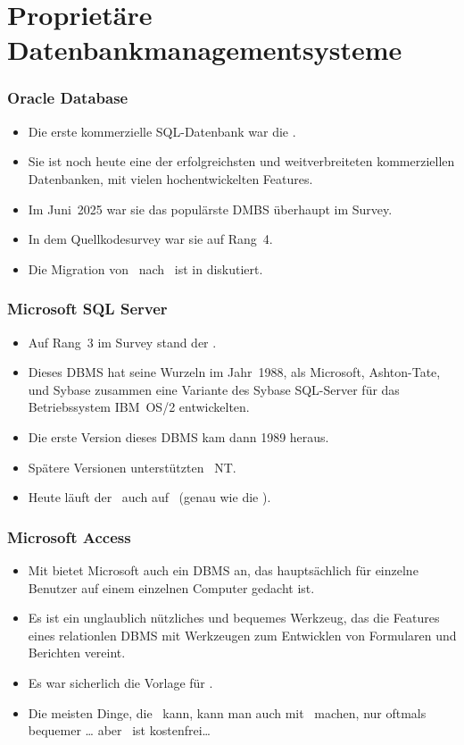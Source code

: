 \documentclass[aspectratio=169,mathserif,notheorems]{beamer}%
\begin{document}
\section{Proprietäre Datenbankmanagementsysteme}%
%
\begin{frame}%
\frametitle{Oracle Database}%
\begin{itemize}%
\item Die erste kommerzielle SQL-Datenbank war die \oracleDB\cite{C20245YOQ,O2007OTHTMIMIOHWCFTPWMIH}.%
\item<2-> Sie ist noch heute eine der erfolgreichsten und weitverbreiteten kommerziellen Datenbanken, mit vielen hochentwickelten Features\cite{BBDDSY2011ADOODM,KK2021EODATASFHPAP}.%
\item<3-> Im Juni~2025 war sie das populärste DMBS überhaupt im Survey\cite{RS2025DERORD}.
\item<4-> In dem  Quellkodesurvey\cite{PMPVEPWGSMB2025ATAODMSTTHOOSP} war sie auf Rang~4.%
\item<5-> Die Migration von \oracleDB\ nach \postgresql\ ist in\cite{KO2023DMFOTP} diskutiert.%
\end{itemize}%
\end{frame}%
%
\begin{frame}%
\frametitle{Microsoft SQL Server}%
\begin{itemize}%
\item Auf Rang~3 im Survey\cite{RS2025DERORD} stand der \microsoftSqlServer\cite{P2020MSS2ABG,A2024TSAFMSS2,W2018MSSDB}.%
\item<2-> Dieses DBMS hat seine Wurzeln im Jahr~1988, als Microsoft, Ashton-Tate, und Sybase zusammen eine Variante des Sybase SQL-Server für das Betriebssystem IBM~OS/2 entwickelten\cite{W2018MSSDB:TEOMSS}.%
\item<3-> Die erste Version dieses DBMS kam dann 1989 heraus.%
\item<4-> Spätere Versionen unterstützten \microsoftWindows~NT.%
\item<5-> Heute läuft der \microsoftSqlServer\ auch auf \linux~(genau wie die \oracleDB).%
\end{itemize}%
\end{frame}%
%
\begin{frame}%
\frametitle{Microsoft Access}%
\begin{itemize}%
\item Mit \microsoftAccess\cite{LF2022MOSBSO2AM3} bietet Microsoft auch ein DBMS an, das hauptsächlich für einzelne Benutzer auf einem einzelnen Computer gedacht ist.%
\item<2-> Es ist ein unglaublich nützliches und bequemes Werkzeug, das die Features eines relationlen DBMS mit Werkzeugen zum Entwicklen von Formularen und Berichten vereint\cite{SSI2023MA2BTA,B2020HOMA2,UC2021AFD,MM2014RDAMA}.%
\item<3-> Es war sicherlich die Vorlage für \libreofficeBase.%
\item<4-> Die meisten Dinge, die \libreofficeBase\ kann, kann man auch mit \microsoftAccess\ machen, nur oftmals bequemer {\dots} aber \libreofficeBase\ ist kostenfrei\dots%
\end{itemize}%
\end{frame}%
\end{document}
